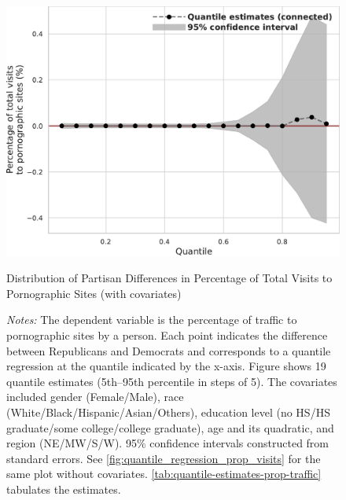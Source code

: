 \documentclass[12pt,twoside]{article}
\begin{document}
\begin{figure}
	\centering
	\includegraphics[width=.6\linewidth]{figs/quantile_reg_covariates_proportion_visits_adult.pdf}
	\caption{Distribution of Partisan Differences in Percentage of Total Visits to Pornographic Sites (with covariates)}
	\caption*{\footnotesize \emph{Notes:} 
		The dependent variable is the percentage of traffic to pornographic sites by a person.
		Each point indicates the difference between Republicans and Democrats and corresponds to a quantile regression at the quantile indicated by the x-axis.
  Figure shows 19 quantile estimates (5th--95th percentile in steps of 5).
		The covariates included gender (Female/Male), race (White/Black/Hispanic/Asian/Others), education level (no HS/HS graduate/some college/college graduate), age and its quadratic, and region (NE/MW/S/W).
		95\% confidence intervals constructed from standard errors.
		See \cref{fig:quantile_regression_prop_visits} for the same plot without covariates.
            \cref{tab:quantile-estimates-prop-traffic} tabulates the estimates.
	}
	\label{fig:quantile_regression_prop_visits_covariates}
\end{figure}
\end{document}

